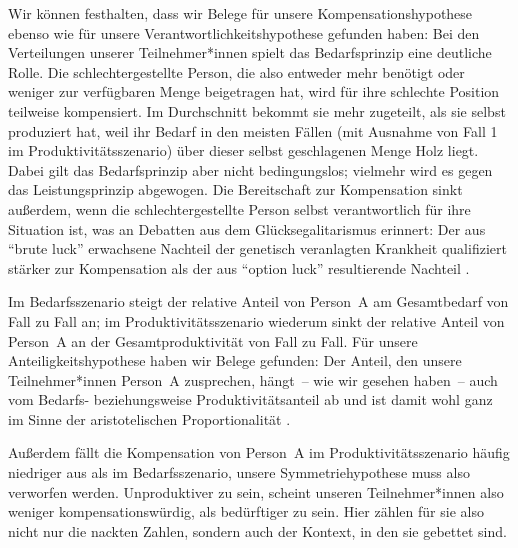 \documentclass[justified,nobib,symmetric,twoside]{tufte-handout}
\begin{document}
Wir können festhalten, dass wir Belege für unsere Kompensationshypothese ebenso wie für unsere Verantwortlichkeitshypothese gefunden haben: Bei den Verteilungen unserer Teilnehmer*innen spielt das Bedarfsprinzip eine deutliche Rolle.
Die schlechtergestellte Person, die also entweder mehr benötigt oder weniger zur verfügbaren Menge beigetragen hat, wird für ihre schlechte Position teilweise kompensiert.
Im Durchschnitt bekommt sie mehr zugeteilt, als sie selbst produziert hat, weil ihr Bedarf in den meisten Fällen (mit Ausnahme von Fall 1 im Produktivitätsszenario) über dieser selbst geschlagenen Menge Holz liegt.
Dabei gilt das Bedarfsprinzip aber nicht bedingungslos; vielmehr wird es gegen das Leistungsprinzip abgewogen.
Die Bereitschaft zur Kompensation sinkt außerdem, wenn die schlechtergestellte Person selbst verantwortlich für ihre Situation ist, was an Debatten aus dem Glücks\-egalitarismus erinnert: Der aus \enquote{brute luck} erwachsene Nachteil der genetisch veranlagten Krankheit qualifiziert stärker zur Kompensation als der aus \enquote{option luck} resultierende Nachteil \citep{dworkin_sovereign_2000}.

Im Bedarfsszenario steigt der relative Anteil von Person~A am Gesamtbedarf von Fall zu Fall an; im Produktivitätsszenario wiederum sinkt der relative Anteil von Person~A an der Gesamtproduktivität von Fall zu Fall. Für unsere Anteiligkeitshypothese haben wir Belege gefunden: Der Anteil, den unsere Teilnehmer*innen Person~A zusprechen, hängt~-- wie wir gesehen haben~-- auch vom Bedarfs- beziehungsweise Produktivitätsanteil ab und ist damit wohl ganz im Sinne der aristotelischen Proportionalität \citep[167--172, 1131\,a--1132\,b]{aristoteles_nikomachische_2006}.

Außerdem fällt die Kompensation von Person~A im Produktivitätsszenario häufig niedriger aus als im Bedarfsszenario, unsere Symmetriehypothese muss also verworfen werden.
Unproduktiver zu sein, scheint unseren Teilnehmer*innen also weniger kompensationswürdig, als bedürftiger zu sein.
Hier zählen für sie also nicht nur die nackten Zahlen, sondern auch der Kontext, in den sie gebettet sind.


\end{document}
